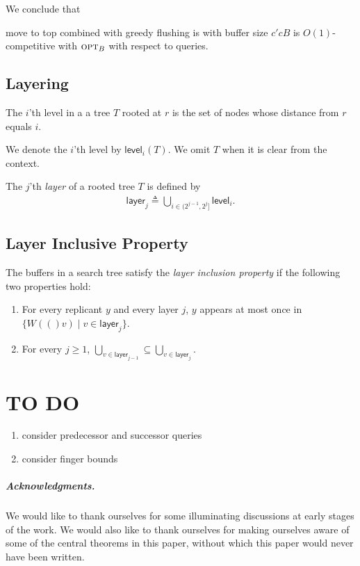 \documentclass[a4paper,UKenglish]{lipics-v2016}
\newcommand{\level}{\textsf{level}}
\newcommand{\opt}{\mbox{\sc opt}}
\newcommand{\buf}[1]{W(#1)}
\newcommand{\tree}{T}
\newcommand{\layer}{\textsf{layer}}
\begin{document}
We conclude that 
\begin{theorem}
move to top combined with greedy flushing is with buffer size $c'cB$ is $O(1)$-competitive with $\opt_B$ with respect to queries.
\end{theorem}

\subsection{Layering}
\begin{definition}
The $i$'th level in a a tree $\tree$ rooted at $r$ is the set of nodes whose distance from $r$ equals $i$. 
\end{definition}
We denote the $i$'th level by $\level_i(\tree)$. We omit $\tree$ when it is clear from the context.

\begin{definition}
The $j$'th \emph{layer} of a rooted tree $\tree$ is defined by
\begin{align*}
\layer_j \triangleq \bigcup_{i\in (2^{j-1},2^j]} \level_i.
\end{align*}
\end{definition}

\subsection{Layer Inclusive Property}
\begin{definition}
The buffers in a search tree satisfy the \emph{layer inclusion property} if the following two properties hold:
\begin{enumerate}
\item For every replicant $y$ and every layer $j$, $y$ appears at most once in $\{\buf(v)\mid v\in \layer_j\}$.
\item For every $j\geq 1$, $\bigcup_{v\in \layer_{j-1}} \subseteq \bigcup_{v\in \layer_{j}}$. 
\end{enumerate}
\end{definition}
\section{TO DO}
\begin{enumerate}
\item consider predecessor and successor queries
\item consider finger bounds
\end{enumerate}
\subparagraph*{Acknowledgments.}
We would like to thank ourselves for some illuminating discussions at early stages of the work. We would also like to thank ourselves for making ourselves aware of some of the central theorems in this paper, without which this paper would never have been written. 
\end{document}
